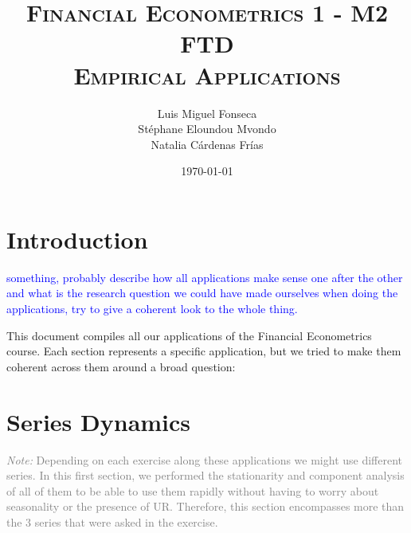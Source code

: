 \documentclass[hidelinks,12pts]{article}
\DeclareMathOperator{\1}{\mathbbm{1}}
\begin{document}
        \title{\scshape{Financial Econometrics 1 - M2 FTD \\ Empirical Applications}}
        \author{Luis Miguel Fonseca \\ Stéphane Eloundou Mvondo\\ Natalia Cárdenas Frías }
        \date{\today}
        \maketitle 

\tableofcontents
\newpage


\section*{Introduction} 
\textcolor{blue}{something, probably describe how all applications make sense one after the other and what is the research question we could have made ourselves when doing the applications, try to give a coherent look to the whole thing.}

This document compiles all our applications of the Financial Econometrics course. 
Each section represents a specific application, but we tried to make them coherent across them around a broad question: 





\section{Series Dynamics}\label{sec:dynamics}

\textcolor{gray}{\emph{Note:} Depending on each exercise along these applications we might use different series. In this first section, we performed the stationarity and component analysis of all of them to be able to use them rapidly without having to worry about seasonality or the presence of UR. Therefore, this section encompasses more than the 3 series that were asked in the exercise.}
\end{document}
